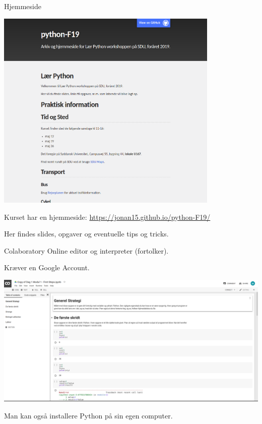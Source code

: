 \documentclass[10pt]{beamer}
\begin{document}
\begin{frame}[fragile]{Hjemmeside}

	\begin{center}
		\includegraphics[width=0.8\textwidth]{webpage.png}
	\end{center}
	Kurset har en hjemmeside: \url{https://jonan15.github.io/python-F19/}

	Her findes slides, opgaver og eventuelle tips og tricks.	
\end{frame}

\begin{frame}{Colaboratory}
	Online editor og interpreter (fortolker).

  Kræver en Google Account.
	\begin{center}
		\includegraphics[width=\textwidth]{colaboratory.png}
	\end{center}

  Man kan også installere Python på sin egen computer.
\end{frame}
\end{document}
